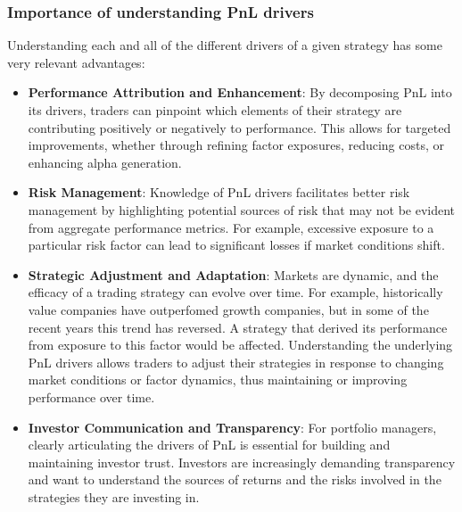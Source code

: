 \subsubsection{Importance of understanding PnL drivers}
Understanding each and all of the different drivers of a given strategy has some very relevant advantages:
\begin{itemize}
    \item \textbf{Performance Attribution and Enhancement}: By decomposing PnL into its drivers, traders can pinpoint which elements of their strategy are contributing positively or negatively to performance. This allows for targeted improvements, whether through refining factor exposures, reducing costs, or enhancing alpha generation. \cite{grinold_kahn_1999}
    \item \textbf{Risk Management}: Knowledge of PnL drivers facilitates better risk management by highlighting potential sources of risk that may not be evident from aggregate performance metrics. For example, excessive exposure to a particular risk factor can lead to significant losses if market conditions shift. \cite{ang_2014}
    \item \textbf{Strategic Adjustment and Adaptation}: Markets are dynamic, and the efficacy of a trading strategy can evolve over time. For example, historically value companies have outperfomed growth companies, but in some of the recent years this trend has reversed. A strategy that derived its performance from exposure to this factor would be affected. Understanding the underlying PnL drivers allows traders to adjust their strategies in response to changing market conditions or factor dynamics, thus maintaining or improving performance over time. \cite{lo_2004}
    \item \textbf{Investor Communication and Transparency}: For portfolio managers, clearly articulating the drivers of PnL is essential for building and maintaining investor trust. Investors are increasingly demanding transparency and want to understand the sources of returns and the risks involved in the strategies they are investing in. \cite{elif_baykal_2019}
\end{itemize}
